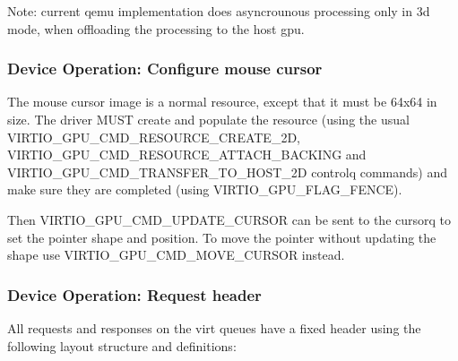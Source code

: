 Note: current qemu implementation does asyncrounous processing only in
3d mode, when offloading the processing to the host gpu.

\subsubsection{Device Operation: Configure mouse cursor}

The mouse cursor image is a normal resource, except that it must be
64x64 in size.  The driver MUST create and populate the resource
(using the usual VIRTIO_GPU_CMD_RESOURCE_CREATE_2D,
VIRTIO_GPU_CMD_RESOURCE_ATTACH_BACKING and
VIRTIO_GPU_CMD_TRANSFER_TO_HOST_2D controlq commands) and make sure they
are completed (using VIRTIO_GPU_FLAG_FENCE).

Then VIRTIO_GPU_CMD_UPDATE_CURSOR can be sent to the cursorq to set
the pointer shape and position.  To move the pointer without updating
the shape use VIRTIO_GPU_CMD_MOVE_CURSOR instead.

\subsubsection{Device Operation: Request header}\label{sec:Device Types / GPU Device / Device Operation / Device Operation: Request header}

All requests and responses on the virt queues have a fixed header
using the following layout structure and definitions:

